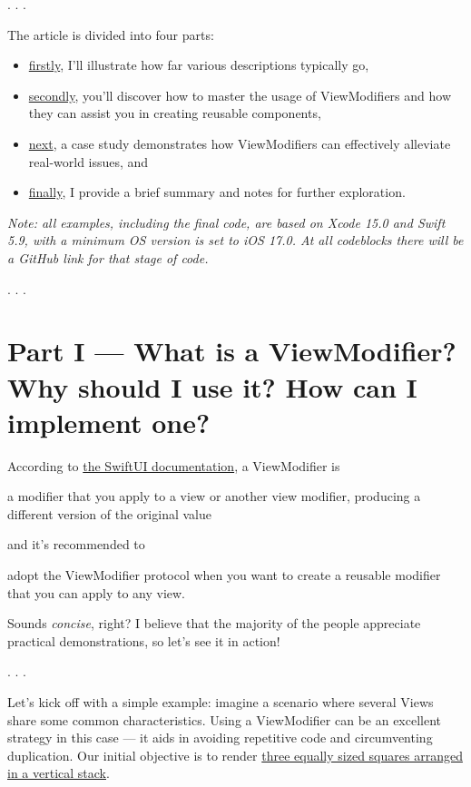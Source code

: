 \documentclass{article}
\newcommand{\separator}{\vspace{5mm}\centerline{. . .}\vspace{5mm}}
\begin{document}
\separator

The article is divided into four parts:

\begin{itemize}
  \item \hyperref[sec:part1]{firstly}, I’ll illustrate how far various descriptions typically go,
  \item \hyperref[sec:part2]{secondly}, you’ll discover how to master the usage of ViewModifiers and how they can assist you in creating reusable components,
  \item \hyperref[sec:part3]{next}, a case study demonstrates how ViewModifiers can effectively alleviate real-world issues, and
  \item \hyperref[sec:part4]{finally}, I provide a brief summary and notes for further exploration.
\end{itemize}

\emph{Note: all examples, including the final code, are based on Xcode 15.0 and Swift 5.9, with a minimum OS version is set to iOS 17.0. At all codeblocks there will be a GitHub link for that stage of code.}

\separator

\section{Part I — What is a ViewModifier? Why should I use it? How can I implement one?}
\label{sec:part1}

According to \href{https://developer.apple.com/documentation/swiftui/viewmodifier}{the SwiftUI documentation}, a ViewModifier is

\begin{displayquote}
a modifier that you apply to a view or another view modifier, producing a different version of the original value
\end{displayquote}

and it’s recommended to

\begin{displayquote}
adopt the ViewModifier protocol when you want to create a reusable modifier that you can apply to any view.
\end{displayquote}

Sounds \emph{concise}, right? I believe that the majority of the people appreciate practical demonstrations, so let’s see it in action!

\separator

Let’s kick off with a simple example: imagine a scenario where several Views share some common characteristics. Using a ViewModifier can be an excellent strategy in this case — it aids in avoiding repetitive code and circumventing duplication. Our initial objective is to render \hyperref[fig:contentview]{three equally sized squares arranged in a vertical stack}.
\end{document}
